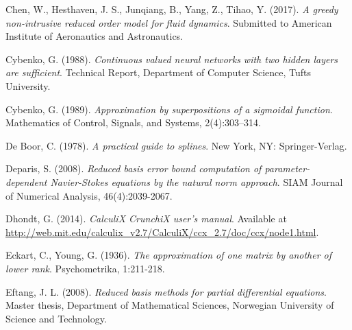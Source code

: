 \documentclass{elsarticle}
\numberwithin{equation}{section}
\theoremstyle{theorem}
\theoremstyle{definition}
\theoremstyle{remark}
\theoremstyle{proposition}
\numberwithin{figure}{section}
\begin{document}
\begin{thebibliography}{50}
		
		Chen, W., Hesthaven, J. S., Junqiang, B., Yang, Z., Tihao, Y. (2017). \emph{A greedy non-intrusive reduced order model for fluid dynamics}. Submitted to American Institute of Aeronautics and Astronautics.
	
		Cybenko, G. (1988). \emph{Continuous valued neural networks with two hidden layers are sufficient}. Technical Report, Department of Computer Science, Tufts University.
		
		Cybenko, G. (1989). \emph{Approximation by superpositions of a sigmoidal function}. Mathematics of Control, Signals, and Systems, 2(4):303–314.
		
		De Boor, C. (1978). \emph{A practical guide to splines}. New York, NY: Springer-Verlag.
		
		
		Deparis, S. (2008). \emph{Reduced basis error bound computation of parameter-dependent Navier-Stokes equations by the natural norm approach}. SIAM Journal of Numerical Analysis, 46(4):2039-2067.
		
		Dhondt, G. (2014). \emph{CalculiX CrunchiX user's manual}. Available at \url{http://web.mit.edu/calculix_v2.7/CalculiX/ccx_2.7/doc/ccx/node1.html}.
		
		Eckart, C., Young, G. (1936). \emph{The approximation of one matrix by another of lower rank}. Psychometrika, 1:211-218.
		
		Eftang, J. L. (2008). \emph{Reduced basis methods for partial differential equations}. Master thesis, Department of Mathematical Sciences, Norwegian University of Science and Technology.
		
				
		

\end{thebibliography}
\end{document}
